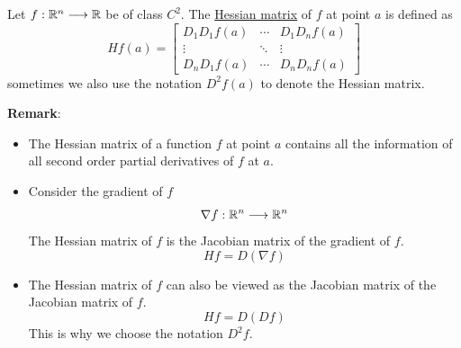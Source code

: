 \begin{definition}
    Let $f:\mathbb{R}^n\longrightarrow \mathbb{R}$ be of class $C^2$. The \underline{Hessian matrix} of $f$ at point $a$ is defined as
    $$Hf(a)=\begin{bmatrix}
        D_1D_1f(a) & \cdots & D_1D_nf(a)\\
        \vdots & \ddots & \vdots\\
        D_nD_1f(a) & \cdots & D_nD_nf(a)
    \end{bmatrix}$$
    sometimes we also use the notation $D^2f(a)$ to denote the Hessian matrix.
\end{definition}
\noindent \textbf{Remark}:
\begin{itemize}
    \item The Hessian matrix of a function $f$ at point $a$ contains all the information of all second order partial derivatives of $f$ at $a$.
    \item Consider the gradient of $f$
    $$\nabla f :\mathbb{R}^n \longrightarrow\mathbb{R}^n$$
    The Hessian matrix of $f$ is the Jacobian matrix of the gradient of $f$.
    $$Hf=D(\nabla f)$$
    \item The Hessian matrix of $f$ can also be viewed as the Jacobian matrix of the Jacobian matrix of $f$.
    $$Hf=D(D f)$$
    This is why we choose the notation $D^2f$.
\end{itemize}


